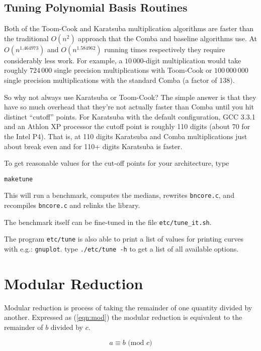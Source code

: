 \documentclass[synpaper]{book}
\begin{document}
\section{Tuning Polynomial Basis Routines}

Both of the Toom-Cook and Karatsuba multiplication algorithms are faster than the traditional $O(n^2)$ approach that
the Comba and baseline algorithms use.  At $O(n^{1.464973})$ and $O(n^{1.584962})$ running times respectively they require
considerably less work.  For example, a $10\,000$-digit multiplication would take roughly $724\,000$ single precision
multiplications with Toom-Cook or $100\,000\,000$ single precision multiplications with the standard Comba (a factor
of 138).

So why not always use Karatsuba or Toom-Cook?   The simple answer is that they have so much overhead that they're not
actually faster than Comba until you hit distinct  ``cutoff'' points.  For Karatsuba with the default configuration,
GCC 3.3.1 and an Athlon XP processor the cutoff point is roughly 110 digits (about 70 for the Intel P4).  That is, at
110 digits Karatsuba and Comba multiplications just about break even and for 110+ digits Karatsuba is faster.

To get reasonable values for the cut-off points for your architecture, type

\begin{alltt}
make tune
\end{alltt}

This will run a benchmark, computes the medians, rewrites \texttt{bncore.c}, and recompiles \texttt{bncore.c} and relinks the library.

The benchmark itself can be fine-tuned in the file \texttt{etc/tune\_it.sh}.

The program \texttt{etc/tune} is also able to print a list of values for printing curves with e.g.: \texttt{gnuplot}. type \texttt{./etc/tune -h} to get a list of all available options.

\chapter{Modular Reduction}

Modular reduction is process of taking the remainder of one quantity divided by another.  Expressed
as (\ref{eqn:mod}) the modular reduction is equivalent to the remainder of $b$ divided by $c$.

\begin{equation}
a \equiv b \mbox{ (mod }c\mbox{)}
\label{eqn:mod}
\end{equation}
\end{document}
